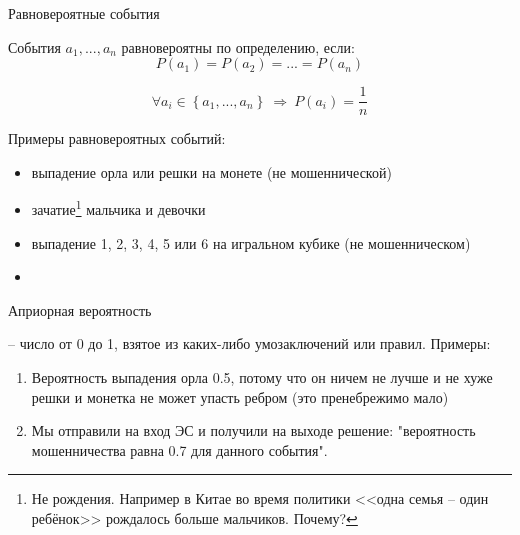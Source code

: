 \begin{frame}{Равновероятные события}
	\small
	
	События  $a_1, ..., a_n$ равновероятны по определению, если:
	\begin{equation}
	P(a_1) = P(a_2) = ... = P(a_n)
	\end{equation}
	
	\begin{equation}
	\forall a_i \in \left\{a_1, ..., a_n \right\} ~\Longrightarrow~ P(a_i) = \frac{1}{n}
	\end{equation}
	
	Примеры равновероятных событий:
	\begin{itemize}
		\item выпадение орла или решки на монете (не мошеннической)
		\item зачатие\footnote{Не рождения. Например в Китае во время политики <<одна семья -- один ребёнок>> рождалось больше мальчиков. Почему?} мальчика и девочки
		\item выпадение 1, 2, 3, 4, 5 или 6 на игральном кубике (не мошенническом)
		\item {}
	\end{itemize}
	
\end{frame}


\begin{frame}{Априорная вероятность}
	
	 -- число от 0 до 1, взятое из каких-либо умозаключений или правил.
	Примеры:
	\begin{enumerate}
		\item Вероятность выпадения орла 0.5, потому что он ничем не лучше и не хуже решки и монетка не может упасть ребром (это пренебрежимо мало)
		\item Мы отправили  на вход ЭС и получили на выходе решение: "вероятность мошенничества равна 0.7 для данного события".
	\end{enumerate}
	
\end{frame}

